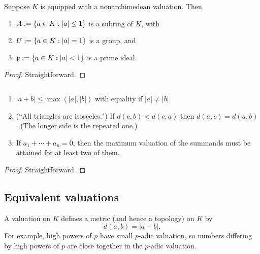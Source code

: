 \begin{pr}
Suppose $K$ is equipped with a nonarchimedean valuation. Then
\begin{enumerate}
\item
$A:=\left\{{a\in K}:{|a|\le1}\right\}$ is a subring of $K$, with 
\item
$U:=\left\{{a\in K}:{|a|=1}\right\}$ is a group, and 
\item
$\mathfrak{p}:=\left\{{a\in K}:{|a|<1}\right\}$ is a prime ideal.
\end{enumerate}
\end{pr}
\begin{proof}
Straightforward.
\end{proof}

\begin{pr}
$\,$
\begin{enumerate}
\item
$|a+b|\le \max(|a|,|b|)$ with equality if $|a|\ne |b|$.
\item (``All triangles are isosceles.") If $d(c,b)<d(c,a)$ then $d(a,c)=d(a,b)$. (The longer side is the repeated one.)
\item If $a_1+\cdots +a_n=0$, then the maximum valuation of the summands must be attained for at least two of them.
\end{enumerate}
\end{pr}
\begin{proof}
Straightforward.
\end{proof}
\subsection{Equivalent valuations}
A valuation on $K$ defines a metric (and hence a topology) on $K$ by
\[
d(a,b)=|a-b|.
\]
For example, high powers of $p$ have small $p$-adic valuation, so numbers differing by high powers of $p$ are close together in the $p$-adic valuation.


